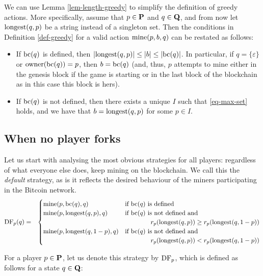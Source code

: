 We can use Lemma \ref{lem-length-greedy} to simplify the definition of greedy actions. More specifically, assume that $p \in \mathbf{P}$ and $q \in \mathbf{Q}$, and from now let ${\text{\rm longest}}(q,p)$ be a string instead of a singleton set. Then the conditions in Definition \ref{def-greedy} for a valid action $\text{\rm mine}(p,b,q)$ can be restated as follows:
\begin{itemize}
\item If $\text{bc}(q)$ is defined, then $|{\text{\rm longest}}(q,p)| \leq |b|  \leq |\text{bc}(q)|$. In particular, 
if $q = \{\varepsilon\}$ or $\text{\rm owner}(\text{bc}(q)) = p$, then $b = \text{bc}(q)$ (and, thus, $p$ attempts to mine either in the genesis block if the game is starting or in the last block of the blockchain as in this case this block is hers).



\item If $\text{bc}(q)$ is not defined, then there exists a unique $I$ such that \eqref{eq-max-set} holds, and we have that $b = {\text{\rm longest}}(q,p)$ for some $p \in I$.
\end{itemize}
\subsection{When no player forks}
\label{sec-defstrategy}

Let us start with analysing the most obvious strategies for all players: regardless of what everyone else does, keep mining on the blockchain. We call this 
the \emph{default} strategy, as is it reflects the desired behaviour of the miners participating in the Bitcoin network. 
\begin{eqnarray*}
\text{\rm DF}_p(q) & = &
\begin{cases}
\text{\rm mine}(p,\text{bc}(q),q) & \text{if } \text{bc}(q) \text{ is defined}\\
\text{\rm mine}(p,{\text{\rm longest}}(q,p),q) & \text{if } \text{bc}(q) \text{ is not defined and} \\
& \hspace{40pt} r_p({\text{\rm longest}}(q,p)) \geq r_p({\text{\rm longest}}(q,1-p))\\
\text{\rm mine}(p,{\text{\rm longest}}(q,1-p),q) & \text{if } \text{bc}(q) \text{ is not defined and}\\
& \hspace{40pt} r_p({\text{\rm longest}}(q,p)) < r_p({\text{\rm longest}}(q,1-p))
\end{cases}
\end{eqnarray*}


For a player $p \in \mathbf{P}$, let us denote this strategy 
by $\text{\rm DF}_p$, which is defined as follows for a state $q \in \mathbf{Q}$:


